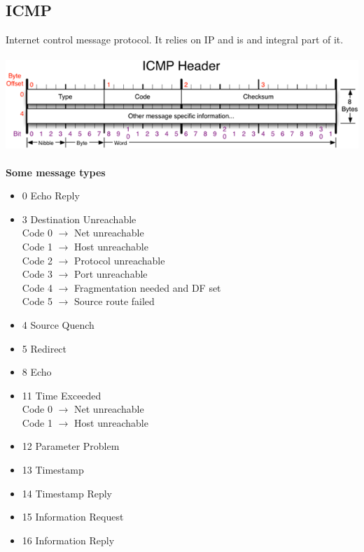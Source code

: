 \documentclass[10pt,a4paper]{article}
\begin{document}
\subsection{ICMP} Internet control message protocol. It relies on IP and is and integral part of it.\\\\
\includegraphics[scale=0.9]{icmp.png}\\\\
\textbf{Some message types}
\begin{itemize}
\item 0		Echo Reply
\item 3		Destination	Unreachable\\
Code 0 $\to$ Net unreachable\\
Code 1 $\to$ Host unreachable\\
Code 2 $\to$ Protocol unreachable\\
Code 3 $\to$ Port unreachable\\
Code 4 $\to$ Fragmentation needed and DF set\\
Code 5 $\to$ Source route failed
\item 4		Source	Quench
\item 5		Redirect
\item 8		Echo
\item 11		Time Exceeded\\
Code 0 $\to$ Net unreachable\\
Code 1 $\to$ Host unreachable
\item 12		Parameter Problem
\item 13		Timestamp
\item 14		Timestamp Reply
\item 15		Information	Request
\item 16		Information	Reply
\end{itemize}
\end{document}
